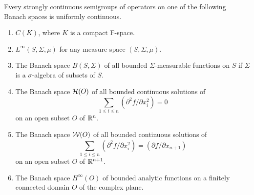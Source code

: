 \begin{theorem}\label{thm:a2-3.6}
Every strongly continuous semigroups of operators on one of the following Banach spaces is uniformly continuous.
\begin{enumerate}[\upshape (i)]
\item \label{thm:a2-3.6-1}
$C(K)$, where $K$ is a compact F-space.
\item \label{thm:a2-3.6-2}
$L^{\infty}(S,\Sigma,\mu)$ for any measure space $(S,\Sigma,\mu)$.
\item \label{thm:a2-3.6-3}
The Banach space $B(S,\Sigma)$ of all bounded $\Sigma$-measurable functions on $S$ if  $\Sigma$ is a  $\sigma$-algebra of subsets of $S$.
\item \label{thm:a2-3.6-4}
The Banach space $\mathcal{H}(O)$ of all bounded continuous solutions of
\[
\sum_{1 \leq i \leq n} (\partial^2f/\partial x_i^2) = 0
\]
on an open subset $O$ of  $\mathbb{R}^n$.
\item \label{thm:a2-3.6-5}
The Banach space $\mathcal{W}(O)$ of all bounded continuous solutions of
\[
\sum_{1 \leq i \leq n} (\partial^2f/\partial x_i^2) = (\partial f/\partial x_{n+1})
\]
on an open subset $O$ of  $\mathbb{R}^{n+1}$.
\item \label{thm:a2-3.6-6}
The Banach space $H^{\infty}(O)$ of bounded analytic functions on a finitely connected domain $O$ of the complex plane.
\end{enumerate}
\end{theorem}
